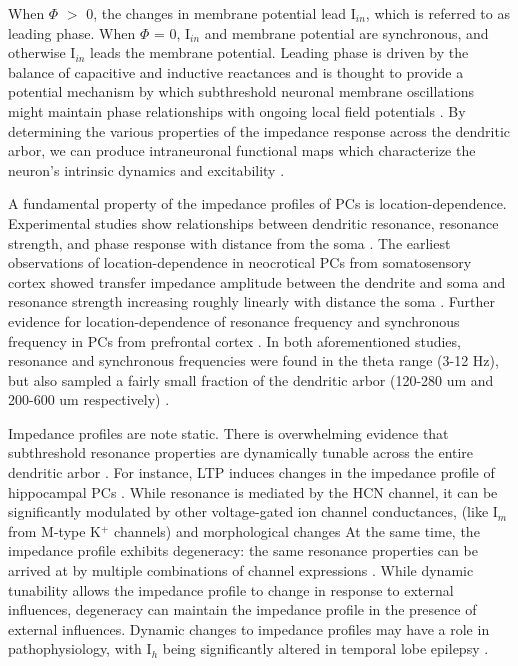 \documentclass[utf8]{frontiersSCNS} %
\begin{document}
When $\Phi$ $>$ 0, the changes in membrane potential lead  I$_{in}$, which is referred to as leading phase.
When $\Phi$ = 0, I$_{in}$ and membrane potential are synchronous, and otherwise I$_{in}$ leads the membrane potential.
Leading phase is driven by the balance of capacitive and inductive reactances and is thought to provide a potential 
mechanism by which subthreshold neuronal membrane oscillations might maintain phase relationships with ongoing
local field potentials
\citep{Mauro1961-ys, Sabah1969-at, Mauro1970-km, Hu2002-ga, Hu2009-qb, Ulrich2002-dd, Cook2007-cz, Narayanan2008-zw, Vaidya2013-sx, Das2017-nz}.  
By determining the various properties of the impedance response across the dendritic arbor, we can produce intraneuronal 
functional maps which characterize the neuron's intrinsic dynamics and excitability \citep{Narayanan2012-hn}.

A fundamental property of the impedance profiles of PCs is location-dependence. Experimental
studies show relationships between dendritic resonance, resonance strength, and 
phase response with distance from the soma \citep{Das2017-nz, Narayanan2007-gw, Ulrich2002-dd, Dembrow2015-zb}.
The earliest observations of location-dependence in neocrotical PCs from somatosensory cortex 
showed transfer impedance amplitude between the dendrite and soma and resonance strength 
increasing roughly linearly with distance the soma \citep{Ulrich2002-dd}. Further evidence for 
location-dependence of resonance frequency and synchronous frequency in PCs from prefrontal cortex \citep{Dembrow2015-zb}.
In both aforementioned studies, resonance and synchronous frequencies were found in the theta 
range (3-12 Hz), but also sampled a fairly small fraction of the dendritic arbor (120-280 um and 
200-600 um respectively) \citep{Ulrich2002-dd, Dembrow2015-zb}.

Impedance profiles are note static.  There is overwhelming evidence that subthreshold resonance
properties are dynamically tunable across the entire dendritic arbor \citep{Magee2005-oq, Narayanan2007-gw, Narayanan2008-zw, Sjostrom2008-sz, Hu2009-qb, Rathour2012-am, Rathour2012-bu, Das2017-nz}.
For instance, LTP induces changes in the impedance profile of hippocampal PCs \citep{Narayanan2007-gw}.
While resonance is mediated by the HCN channel, it can be significantly modulated by other voltage-gated ion channel conductances, (like I$_m$ from M-type K$^+$ channels)
and morphological changes \citep{Hutcheon2000-gs, Hu2002-ga, Narayanan2008-zw, Zemankovics2010-zt, Rathour2012-bu, Dhupia2014-ad, Rathour2016-vv}
At the same time, the impedance profile exhibits degeneracy: the same resonance properties can be arrived at by
multiple combinations of channel expressions \citep{Rathour2012-bu, Rathour2014-pl, Das2017-nz}. While dynamic 
tunability allows the impedance profile to change in response to external influences, degeneracy can maintain the 
impedance profile in the presence of external influences.  Dynamic changes to impedance profiles may have a role in
pathophysiology, with I$_h$ being significantly altered in temporal lobe epilepsy \citep{Shin2008-za, Marcelin2009-vy}.
\end{document}

